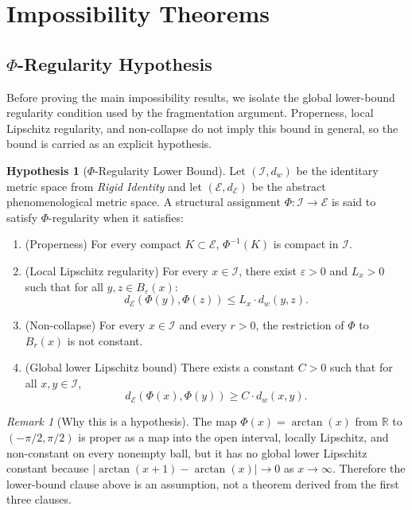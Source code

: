 \documentclass[11pt,a4paper]{article}
\theoremstyle{plain}
\theoremstyle{definition}
\newtheorem{hypothesis}[theorem]{Hypothesis}
\theoremstyle{remark}
\newtheorem{remark}[theorem]{Remark}
\begin{document}
\section{Impossibility Theorems}

\subsection{\texorpdfstring{$\Phi$-Regularity Hypothesis}{Phi-Regularity Hypothesis}}

Before proving the main impossibility results, we isolate the global lower-bound regularity condition used by the fragmentation argument. Properness, local Lipschitz regularity, and non-collapse do not imply this bound in general, so the bound is carried as an explicit hypothesis.

\begin{hypothesis}[$\Phi$-Regularity Lower Bound]\label{hyp:phi-paper2}
Let $(\mathcal{I}, d_w)$ be the identitary metric space from \textit{Rigid Identity} and let $(\mathcal{E}, d_\mathcal{E})$ be the abstract phenomenological metric space. A structural assignment $\Phi: \mathcal{I} \to \mathcal{E}$ is said to satisfy $\Phi$-regularity when it satisfies:
\begin{enumerate}[leftmargin=*]
    \item (Properness) For every compact $K \subset \mathcal{E}$, $\Phi^{-1}(K)$ is compact in $\mathcal{I}$.
    \item (Local Lipschitz regularity) For every $x \in \mathcal{I}$, there exist $\varepsilon > 0$ and $L_x > 0$ such that for all $y, z \in B_\varepsilon(x)$:
    \begin{equation}
        d_\mathcal{E}(\Phi(y), \Phi(z)) \leq L_x \cdot d_w(y, z).
    \end{equation}
    \item (Non-collapse) For every $x \in \mathcal{I}$ and every $r > 0$, the restriction of $\Phi$ to $B_r(x)$ is not constant.
    \item (Global lower Lipschitz bound) There exists a constant $C>0$ such that for all $x,y\in\mathcal{I}$,
    \begin{equation}
        d_\mathcal{E}(\Phi(x),\Phi(y)) \geq C\cdot d_w(x,y).
    \end{equation}
\end{enumerate}
\end{hypothesis}

\begin{remark}[Why this is a hypothesis]
The map $\Phi(x)=\arctan(x)$ from $\mathbb{R}$ to $(-\pi/2,\pi/2)$ is proper as a map into the open interval, locally Lipschitz, and non-constant on every nonempty ball, but it has no global lower Lipschitz constant because $|\arctan(x+1)-\arctan(x)|\to0$ as $x\to\infty$. Therefore the lower-bound clause above is an assumption, not a theorem derived from the first three clauses.
\end{remark}
\end{document}
